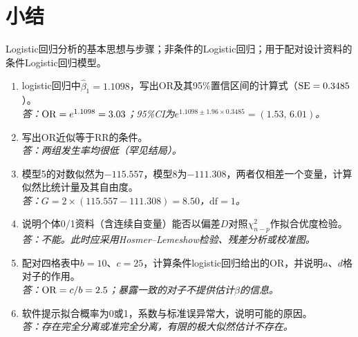 \section*{小结}
Logistic回归分析的基本思想与步骤；非条件的Logistic回归；用于配对设计资料的条件Logistic回归模型。

\begin{fuxi}[复习题]
\begin{enumerate}
\item logistic回归中$\widehat\beta_1=1.1098$，写出OR及其95\%置信区间的计算式（$\operatorname{SE}=0.3485$）。\\
\textit{答：$\operatorname{OR}=e^{1.1098}=3.03$；95\%CI为$e^{1.1098\pm1.96\times0.3485}=(1.53,\,6.01)$。}
\item 写出OR近似等于RR的条件。\\
\textit{答：两组发生率均很低（罕见结局）。}
\item 模型5的对数似然为$-115.557$，模型8为$-111.308$，两者仅相差一个变量，计算似然比统计量及其自由度。\\
\textit{答：$G=2\times(115.557-111.308)=8.50$，$\mathrm{df}=1$。}
\item 说明个体0/1资料（含连续自变量）能否以偏差$D$对照$\chi^2_{n-p}$作拟合优度检验。\\
\textit{答：不能。此时应采用Hosmer--Lemeshow检验、残差分析或校准图。}
\item 配对四格表中$b=10$、$c=25$，计算条件logistic回归给出的OR，并说明$a$、$d$格对子的作用。\\
\textit{答：$\operatorname{OR}=c/b=2.5$；暴露一致的对子不提供估计$\beta$的信息。}
\item 软件提示拟合概率为0或1，系数与标准误异常大，说明可能的原因。\\
\textit{答：存在完全分离或准完全分离，有限的极大似然估计不存在。}
\end{enumerate}
\end{fuxi}
